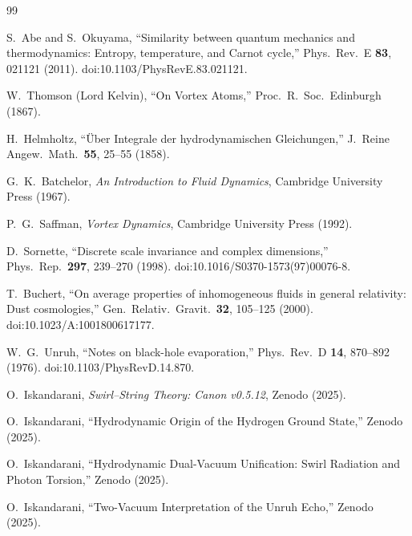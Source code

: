 \documentclass[11pt]{article}
\begin{document}


        \begin{thebibliography}{99}

            S.~Abe and S.~Okuyama,
            ``Similarity between quantum mechanics and thermodynamics:
            Entropy, temperature, and Carnot cycle,''
            Phys.\ Rev.\ E \textbf{83}, 021121 (2011).
            doi:10.1103/PhysRevE.83.021121.

            W.~Thomson (Lord Kelvin),
            ``On Vortex Atoms,''
            Proc.\ R.\ Soc.\ Edinburgh (1867).

            H.~Helmholtz,
            ``Über Integrale der hydrodynamischen Gleichungen,''
            J.\ Reine Angew.\ Math.\ \textbf{55}, 25--55 (1858).

            G.~K.~Batchelor,
            \emph{An Introduction to Fluid Dynamics},
            Cambridge University Press (1967).

            P.~G.~Saffman,
            \emph{Vortex Dynamics},
            Cambridge University Press (1992).

            D.~Sornette,
            ``Discrete scale invariance and complex dimensions,''
            Phys.\ Rep.\ \textbf{297}, 239--270 (1998).
            doi:10.1016/S0370-1573(97)00076-8.

            T.~Buchert,
            ``On average properties of inhomogeneous fluids in general relativity: Dust cosmologies,''
            Gen.\ Relativ.\ Gravit.\ \textbf{32}, 105--125 (2000).
            doi:10.1023/A:1001800617177.

            W.~G.~Unruh,
            ``Notes on black-hole evaporation,''
            Phys.\ Rev.\ D \textbf{14}, 870--892 (1976).
            doi:10.1103/PhysRevD.14.870.

            O.~Iskandarani,
            \emph{Swirl--String Theory: Canon v0.5.12},
            Zenodo (2025).

            O.~Iskandarani,
            ``Hydrodynamic Origin of the Hydrogen Ground State,''
            Zenodo (2025).

            O.~Iskandarani,
            ``Hydrodynamic Dual-Vacuum Unification: Swirl Radiation and Photon Torsion,''
            Zenodo (2025).

            O.~Iskandarani,
            ``Two-Vacuum Interpretation of the Unruh Echo,''
            Zenodo (2025).

        \end{thebibliography}
\end{document}
